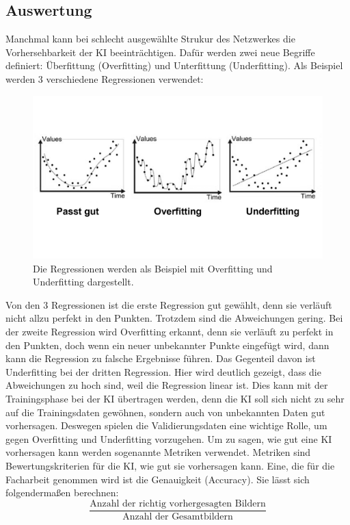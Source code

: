 \documentclass[11pt]{article}
\begin{document}
\subsection{Auswertung}\label{auswertung}
Manchmal kann bei schlecht ausgewählte Strukur des Netzwerkes die Vorhersehbarkeit der KI beeinträchtigen.
Dafür werden zwei neue Begriffe definiert: Überfittung (Overfitting) und Unterfittung (Underfitting).
Als Beispiel werden 3 verschiedene Regressionen verwendet:
\begin{figure}[h]
    \centering
    \includegraphics[width=330pt, keepaspectratio]{images/overfitting}
    \caption[Overfitting und Underfitting]{Die Regressionen werden als Beispiel mit Overfitting und Underfitting dargestellt.}
\end{figure}
Von den 3 Regressionen ist die erste Regression gut gewählt, denn sie verläuft nicht allzu perfekt in den Punkten. Trotzdem sind die
Abweichungen gering. Bei der zweite Regression wird Overfitting erkannt, denn sie verläuft zu perfekt in den Punkten, doch wenn
ein neuer unbekannter Punkte eingefügt wird, dann kann die Regression zu falsche Ergebnisse führen. Das Gegenteil davon ist Underfitting
bei der dritten Regression. Hier wird deutlich gezeigt, dass die Abweichungen zu hoch sind, weil die Regression linear ist.
Dies kann mit der Trainingsphase bei der KI übertragen werden, denn die KI soll sich nicht zu sehr auf die Trainingsdaten gewöhnen,
sondern auch von unbekannten Daten gut vorhersagen. Deswegen spielen die Validierungsdaten eine wichtige Rolle, um gegen Overfitting
und Underfitting vorzugehen. Um zu sagen, wie gut eine KI vorhersagen kann werden sogenannte Metriken verwendet. Metriken sind Bewertungskriterien für die KI,
wie gut sie vorhersagen kann. Eine, die für die Facharbeit genommen wird ist die Genauigkeit (Accuracy). Sie lässt sich folgendermaßen
berechnen:
\begin{equation}
    \frac{\text{Anzahl der richtig vorhergesagten Bildern}}{\text{Anzahl der Gesamtbildern}}
\end{equation}
\end{document}
